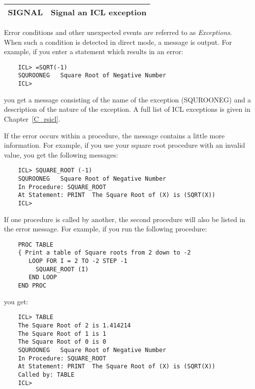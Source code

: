 \begin{center}
\begin{tabular}{|l|l|}
\hline
SIGNAL      & Signal an ICL exception \\
\hline
\end{tabular}
\end{center}

Error conditions and other unexpected events are referred to as
{\em Exceptions}.
When such a condition is detected in direct mode, a message is output.
For example, if you enter a statement which results in an error:

\begin{small}
\begin{verbatim}
    ICL> =SQRT(-1)
    SQUROONEG   Square Root of Negative Number
    ICL>
\end{verbatim}
\end{small}

you get a message consisting of the name of the exception (SQUROONEG) and
a description of the nature of the exception.
A full list of ICL exceptions is given in Chapter~\ref{C_rsicl}.

If the error occurs within a procedure, the message contains a little more
information.
For example, if you use your square root procedure with an invalid value, you
get the following messages:

\begin{small}
\begin{verbatim}
    ICL> SQUARE_ROOT (-1)
    SQUROONEG   Square Root of Negative Number
    In Procedure: SQUARE_ROOT
    At Statement: PRINT  The Square Root of (X) is (SQRT(X))
    ICL>
\end{verbatim}
\end{small}

If one procedure is called by another, the second procedure will also be listed
in the error message.
For example, if you run the following procedure:

\begin{small}
\begin{verbatim}
    PROC TABLE
    { Print a table of Square roots from 2 down to -2
       LOOP FOR I = 2 TO -2 STEP -1
         SQUARE_ROOT (I)
       END LOOP
    END PROC
\end{verbatim}
\end{small}

you get:

\begin{small}
\begin{verbatim}
    ICL> TABLE
    The Square Root of 2 is 1.414214
    The Square Root of 1 is 1
    The Square Root of 0 is 0
    SQUROONEG   Square Root of Negative Number
    In Procedure: SQUARE_ROOT
    At Statement: PRINT  The Square Root of (X) is (SQRT(X))
    Called by: TABLE
    ICL>
\end{verbatim}
\end{small}


